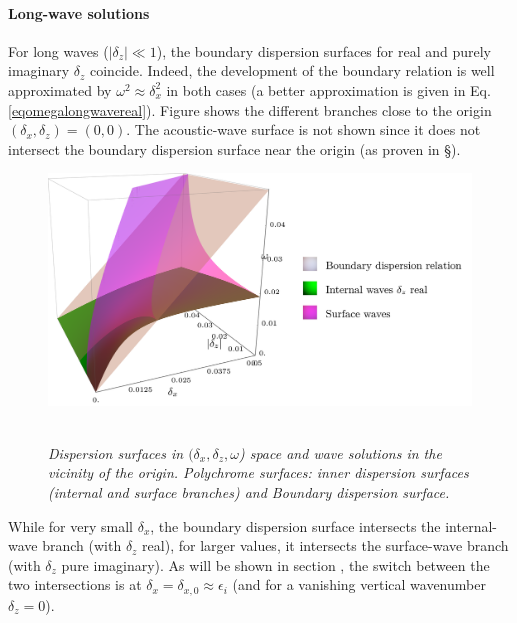 \paragraph{Long-wave solutions}
For long waves ($|\delta_z| \ll 1$), the boundary dispersion surfaces for real and purely imaginary $\delta_z$ coincide. Indeed, the development of the boundary relation is well approximated by $\omega^2\approx \delta_x^2$ in both cases (a better approximation is given in Eq. \ref{eqomegalongwavereal}).
Figure  shows the different branches close to the origin $(\delta_x, \delta_z)=(0,0)$. The acoustic-wave surface is not shown since it does not intersect the boundary dispersion surface near the origin (as proven in \S{}).
\begin{figure}[!h]
	\centering		
		\includegraphics[width=0.6\linewidth]{FIGURES/boundedorigin.png}
	~
	
	\caption{\textit{Dispersion surfaces in $(\delta_x, \delta_z, \omega$) space and wave solutions in the vicinity of the origin. Polychrome surfaces: inner dispersion surfaces (internal and surface branches) and Boundary dispersion surface.
		}
	}
	\label{FigDisLongpSolutions}
\end{figure}
While for very small $\delta_x$, the boundary dispersion surface intersects the internal-wave branch (with $\delta_z$ real), for larger values, it intersects the surface-wave branch (with $\delta_z$ pure imaginary). As will be shown in section , the switch between the two intersections is at $\delta_x=\delta_{x,0}\approx \epsilon_i$ (and for a vanishing vertical wavenumber $\delta_z=0$).

